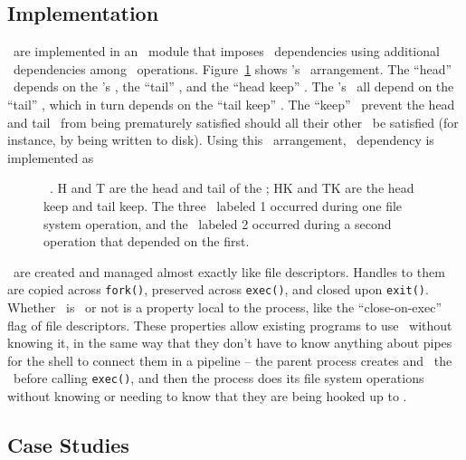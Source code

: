 \subsection{Implementation}
\label{sec:opgroup:implementation}

\Opgroups\ are implemented in an \LFS\ module that imposes \opgroup\
dependencies using additional \chdesc\ dependencies among \LFS\
operations.
%
Figure~\ref{fig:opgroup-chdescs} shows \anopgroup's \chdesc\ arrangement.
%
The ``head'' \chdesc\ depends on the \opgroup's \chdescs, the ``tail''
\chdesc, and the ``head keep'' \chdesc.
%
The \opgroup's \chdescs\ all depend on the ``tail'' \chdesc, which in
turn depends on the ``tail keep'' \chdesc.
%
The ``keep'' \chdescs\ prevent the head and tail \chdescs\ from being
prematurely satisfied should all their other \befores\ be satisfied
(for instance, by being written to disk).
%
Using this \chdesc\ arrangement, \anopgroup\ dependency 
is implemented as 

\begin{figure}[htb]
\caption{\label{fig:opgroup-chdescs} \Opgroup\ \chdescs. H and T are the head
and tail of the \opgroup; HK and TK are the head keep and tail keep. The three
\chdescs\ labeled 1 occurred during one file system operation, and the \chdesc\
labeled 2 occurred during a second operation that depended on the first.}
\end{figure}

\Opgroups\ are created and managed almost exactly like file descriptors. Handles
to them are copied across \texttt{fork()}, preserved across \texttt{exec()}, and
closed upon \texttt{exit()}. Whether \anopgroup\ is \engaged\ or not is a
property local to the process, like the ``close-on-exec'' flag of file
descriptors. These properties allow existing programs to use \opgroups\ without
knowing it, in the same way that they don't have to know anything about pipes
for the shell to connect them in a pipeline -- the parent process creates and
\engages\ the \opgroups\ before calling \texttt{exec()}, and then the process
does its file system operations without knowing or needing to know that they are
being hooked up to \anopgroup.

\subsection{Case Studies}
\label{sec:opgroup:casestudies}

